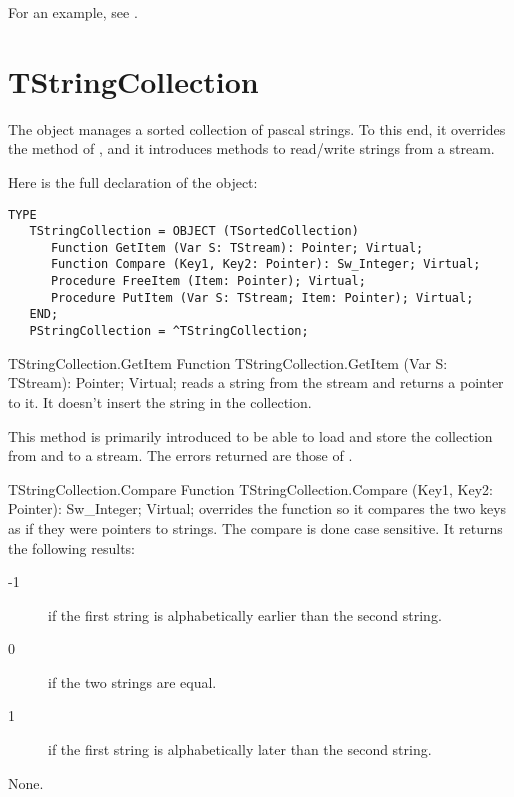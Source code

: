 For an example, see .

\section{TStringCollection}
\label{se:TStringCollection}

The  object manages a sorted collection of pascal 
strings. 
To this end, it overrides the 
method of , and it introduces methods to read/write
strings from a stream.

Here is the full declaration of the  object:
\begin{verbatim}
TYPE
   TStringCollection = OBJECT (TSortedCollection)
      Function GetItem (Var S: TStream): Pointer; Virtual;
      Function Compare (Key1, Key2: Pointer): Sw_Integer; Virtual;
      Procedure FreeItem (Item: Pointer); Virtual;
      Procedure PutItem (Var S: TStream; Item: Pointer); Virtual;
   END;
   PStringCollection = ^TStringCollection;
\end{verbatim}

\begin{function}{TStringCollection.GetItem}
\Declaration
Function TStringCollection.GetItem (Var S: TStream): Pointer; Virtual;
\Description
{} reads a string from the stream  and returns a pointer 
to it. It doesn't insert the string in the collection.

This method is primarily introduced to be able to load and store the
collection from and to a stream.
\Errors
The errors returned are those of .
\SeeAlso
{}
\end{function}

\begin{function}{TStringCollection.Compare}
\Declaration
Function TStringCollection.Compare (Key1, Key2: Pointer): Sw\_Integer; Virtual;
\Description
{} overrides the  function so it compares 
the two keys as if they were pointers to strings. The compare is done case
sensitive. It returns the following results:
\begin{description}
\item[-1] if the first string is alphabetically earlier  than the second
string.
\item[0] if the two strings are equal.
\item[1] if the first string is alphabetically later than the second string.
\end{description}
\Errors
None.
\SeeAlso
{}
\end{function}

